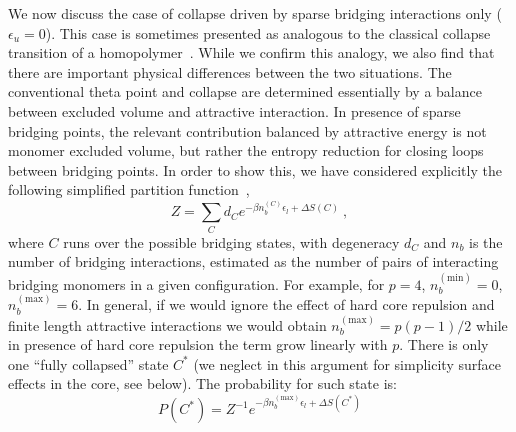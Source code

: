\documentclass[a4paper,12pt,pre,superscriptaddress]{revtex4}
\begin{document}
We now discuss the case of collapse driven by sparse bridging
interactions only ($\epsilon_u = 0$). This case is sometimes presented
as analogous to the classical collapse transition of a
homopolymer~\cite{Barbieri2013a}. While we confirm this analogy, we
also find that there are important physical differences between the
two situations. The conventional theta point and collapse are
determined essentially by a balance between excluded volume and
attractive interaction. In presence of sparse bridging points, the
relevant contribution balanced by attractive energy is not monomer
excluded volume, but rather the entropy reduction for closing loops
between bridging points. In order to show this, we have considered
explicitly the following simplified partition
function~\cite{Marenduzzo2006c,Saiz2006a},
\begin{equation}
  \label{eq:Zloop}
  Z = \sum_{C} d_C e^{-\beta n_b^{(C)} \epsilon_l + \Delta S(C)} \ ,
\end{equation}
where $C$ runs over the possible bridging states, with degeneracy
$d_C$
and $n_b$ is the number of bridging interactions, estimated as the
number of pairs of interacting bridging monomers in a given
configuration. For example, for $p=4$, $n_b^{\mathrm{(min)}}=0$,
$n_b^{\mathrm{(max)}}=6$. In general, if we would ignore the effect of
hard core repulsion and finite length attractive interactions we would
obtain $n_b^{\mathrm{(max)}}=p(p-1)/2$ while in presence of hard core
repulsion the term grow linearly with $p$.
%
There is only one ``fully collapsed'' state $C^*$ (we neglect in
this argument for simplicity surface effects in the core, see
below). The probability for such state is:
\begin{equation}
  \label{eq:prob_collapseZ}
  P(C^*) = Z^{-1}  e^{-\beta n_b^{\mathrm{(max)}} \epsilon_l + \Delta S(C^*)}
\end{equation}
\end{document}
